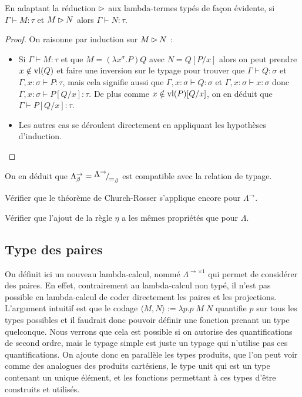 \begin{them}
    En adaptant la réduction $\rhd$ aux lambda-termes typés de façon évidente, si $\Gamma\vdash M : \tau$ et $M\rhd N$ alors $\Gamma\vdash N : \tau$.
\end{them}

\begin{proof}
    On raisonne par induction sur $M\rhd N$ :
    \begin{itemize}[label=$\bullet$]
        \item Si $\Gamma\vdash M : \tau$ et que $M = (\lambda x^\sigma.P)Q$ avec $N = Q[P/x]$ alors on peut prendre $x\notin\mathrm{vl}(Q)$ et faire une inversion sur le typage pour trouver que $\Gamma\vdash Q : \sigma$ et $\Gamma,x : \sigma\vdash P : \tau$, mais cela signifie aussi que $\Gamma,x : \sigma\vdash Q : \sigma$ et $\Gamma, x:\sigma\vdash x : \sigma$ donc $\Gamma,x : \sigma \vdash P[Q/x] : \tau$. De plus comme $x\notin\mathrm{vl}(P)[Q/x]$, on en déduit que $\Gamma\vdash P[Q/x] : \tau$.
        \item Les autres cas se déroulent directement en appliquant les hypothèses d'induction.
    \end{itemize}
\end{proof}

On en déduit que $\Lambda^\to_\beta = \quot{\Lambda^{\to}}{\beteq}$ est compatible avec la relation de typage.

\begin{exo}
    Vérifier que le théorème de Church-Rosser s'applique encore pour $\Lambda^{\to}$.
\end{exo}

\begin{exo}
    Vérifier que l'ajout de la règle $\eta$ a les mêmes propriétés que pour $\Lambda$.
\end{exo}

\subsection{Type des paires}

On définit ici un nouveau lambda-calcul, nommé $\Lambda^{\to\times 1}$ qui permet de considérer des paires. En effet, contrairement au lambda-calcul non typé, il n'est pas possible en lambda-calcul de coder directement les paires et les projections. L'argument intuitif est que le codage $\langle M,N\rangle := \lambda p. p\;M\;N$ quantifie $p$ sur tous les types possibles et il faudrait donc pouvoir définir une fonction prenant un type quelconque. Nous verrons que cela est possible si on autorise des quantifications de second ordre, mais le typage simple est juste un typage qui n'utilise pas ces quantifications. On ajoute donc en parallèle les types produits, que l'on peut voir comme des analogues des produits cartésiens, le type unit qui est un type contenant un unique élément, et les fonctions permettant à ces types d'être construits et utilisés.

